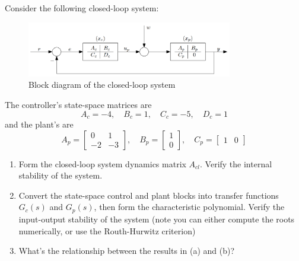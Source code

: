 \section{}
Consider the following closed-loop system:
\begin{figure}[h]
    \centering
    \includegraphics[width=0.8\textwidth]{Questions/Figures/Q3ProblemDiagram.png}
    \caption{Block diagram of the closed-loop system}
    \label{fig:Q3ProblemDiagram}
\end{figure}
The controller's state-space matrices are
\begin{equation*}
    A_c = -4, \quad B_c = 1, \quad C_c = -5, \quad D_c = 1
\end{equation*}
and the plant's are
\begin{equation*}
    A_p = \begin{bmatrix}
        0 & 1 \\
        -2 & -3
    \end{bmatrix}, \quad
    B_p = \begin{bmatrix}
        1 \\
        0
    \end{bmatrix}, \quad
    C_p = \begin{bmatrix}
        1 & 0
    \end{bmatrix}
\end{equation*}
\begin{enumerate}[label=(\alph*)]
    \item Form the closed-loop system dynamics matrix $A_{cl}$. Verify the internal stability of the system.
    \item Convert the state-space control and plant blocks into transfer functions $G_c(s)$ and $G_p(s)$, then form the characteristic polynomial. Verify the input-output stability of the system (note you can either compute the roots numerically, or use the Routh-Hurwitz criterion)
    \item What's the relationship between the results in (a) and (b)?
\end{enumerate}

